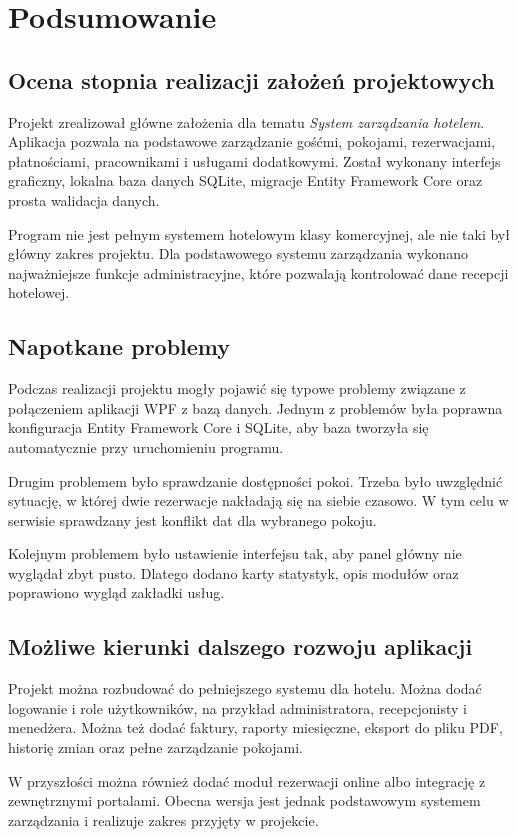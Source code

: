\chapter{Podsumowanie}

\section{Ocena stopnia realizacji założeń projektowych}

Projekt zrealizował główne założenia dla tematu \textit{System zarządzania hotelem}. Aplikacja pozwala na podstawowe zarządzanie gośćmi, pokojami, rezerwacjami, płatnościami, pracownikami i usługami dodatkowymi. Został wykonany interfejs graficzny, lokalna baza danych SQLite, migracje Entity Framework Core oraz prosta walidacja danych.

Program nie jest pełnym systemem hotelowym klasy komercyjnej, ale nie taki był główny zakres projektu. Dla podstawowego systemu zarządzania wykonano najważniejsze funkcje administracyjne, które pozwalają kontrolować dane recepcji hotelowej.

\section{Napotkane problemy}

Podczas realizacji projektu mogły pojawić się typowe problemy związane z połączeniem aplikacji WPF z bazą danych. Jednym z problemów była poprawna konfiguracja Entity Framework Core i SQLite, aby baza tworzyła się automatycznie przy uruchomieniu programu.

Drugim problemem było sprawdzanie dostępności pokoi. Trzeba było uwzględnić sytuację, w której dwie rezerwacje nakładają się na siebie czasowo. W tym celu w serwisie sprawdzany jest konflikt dat dla wybranego pokoju.

Kolejnym problemem było ustawienie interfejsu tak, aby panel główny nie wyglądał zbyt pusto. Dlatego dodano karty statystyk, opis modułów oraz poprawiono wygląd zakładki usług.

\section{Możliwe kierunki dalszego rozwoju aplikacji}

Projekt można rozbudować do pełniejszego systemu dla hotelu. Można dodać logowanie i role użytkowników, na przykład administratora, recepcjonisty i menedżera. Można też dodać faktury, raporty miesięczne, eksport do pliku PDF, historię zmian oraz pełne zarządzanie pokojami.

W przyszłości można również dodać moduł rezerwacji online albo integrację z zewnętrznymi portalami. Obecna wersja jest jednak podstawowym systemem zarządzania i realizuje zakres przyjęty w projekcie.
